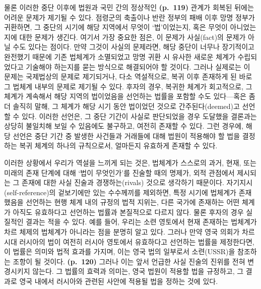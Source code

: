 물론 이러한 중단 이후에 법원과 국민 간의 정상적인 \textbf{(p.~119)}
관계가 회복된 뒤에는 어려운 문제가 제기될 수 있다. 점령군의 축출이나
반란 정부의 패배 이후 망명 정부가 귀환하면, 그 중단의 시기에 해당
지역에서 무엇이 `법'이었는지, 혹은 무엇이 아니었는지에 대한 문제가
생긴다. 여기서 가장 중요한 점은, 이 문제가 사실(fact)의 문제가 아닐 수도
있다는 점이다. 만약 그것이 사실의 문제라면, 해당 중단이 너무나
장기적이고 완전했기 때문에 기존 법체계가 소멸되었고 망명 귀환 시 유사한
새로운 체계가 수립되었다고 기술해야 하는지를 묻는 방식으로 해결되어야 할
것이다. 그러나 실제로는 이 문제는 국제법상의 문제로 제기되거나, 다소
역설적으로, 복귀 이후 존재하게 된 바로 그 법체계 내부의 문제로 제기될 수
있다. 후자의 경우, 복귀한 체계가 회고적으로, 그 체계가 계속해서 해당
지역의 법이었음을 선언하는 법률을 포함할 수도 있다---혹은 좀 더 솔직히
말해, 그 체계가 해당 시기 동안 법이었던 것으로 간주된다(deemed)고 선언할
수 있다. 이러한 선언은, 그 중단 기간이 사실로 판단되었을 경우 도달했을
결론과는 상당히 불일치해 보일 수 있음에도 불구하고, 여전히 존재할 수
있다. 그런 경우에, 해당 선언은 중단 기간 중 발생한 사건들과 거래들에
대해 법원이 적용해야 할 법을 결정하는 복귀 체계의 하나의 규칙으로서,
얼마든지 유효하게 존재할 수 있다.

이러한 상황에서 우리가 역설을 느끼게 되는 것은, 법체계가 스스로의 과거,
현재, 또는 미래의 존재 단계에 대해 `법이 무엇인가'를 진술할 때의 명제가,
외적 관점에서 제시되는 그 존재에 대한 사실 진술과 경쟁하는(rivals)
것으로 생각하기 때문이다. 자기지시(self-reference)의 겉보기에만 있는
수수께끼를 제외하면, 특정 시기에 법체계가 존재했음을 선언하는 현행 체계
내의 규정의 법적 지위는, 다른 국가에 존재하는 어떤 체계가 아직도
유효하다고 선언하는 법률과 본질적으로 다르지 않다. 물론 후자의 경우
실질적인 결과는 적을 수 있다. 예를 들어, 우리는 소련 영토에서 현재
존재하는 법체계가 차르 체제의 법체계가 아니라는 점을 분명히 알고 있다.
그러나 만약 영국 의회가 차르 시대 러시아의 법이 여전히 러시아 영토에서
유효하다고 선언하는 법률을 제정한다면, 이 법률은 의미와 법적 효과를
가지며, 이는 영국 법의 일부로서 소련(USSR)을 참조하는 조항이 될 것이다.
\textbf{(p.~120)} 그러나 이는 앞서 언급한 사실 진술의 진위를 전혀
변경시키지 않는다. 그 법률의 효력과 의미는, 영국 법원이 적용할 법을
규정하고, 그 결과로 영국 내에서 러시아와 관련된 사안에 적용될 법을
정하는 것에 있다.

